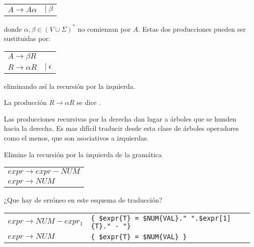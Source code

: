 \vspace{0.25cm}
\begin{center}
\begin{tabular}{ll}
$A   \rightarrow A \alpha$  & $|\ \beta$  
\end{tabular}
\end{center}

\noindent donde $\alpha, \beta \in (V \cup \Sigma)^*$ no comienzan por $A$.
Estas dos producciones pueden ser sustituidas por:

\vspace{0.25cm}
\begin{center}
\begin{tabular}{ll}
$A   \rightarrow \beta R$  &\\
$R   \rightarrow  \alpha R$ &$|\ \epsilon$
\end{tabular}
\end{center}

\noindent
eliminando así la recursión por la izquierda.

\begin{definition}
La producción $R   \rightarrow  \alpha R$ se dice .
\end{definition}

Las producciones recursivas por la derecha dan lugar a árboles
que se hunden hacia la derecha. Es mas difícil traducir desde esta clase
de árboles operadores como el menos, que son asociativos a izquierdas.

\begin{exercise}
Elimine la recursión por la izquierda de la gramática 

\vspace{0.5cm}
\begin{tabular}{l}
$expr   \rightarrow expr  -  NUM$  \\
$expr   \rightarrow NUM$            
\end{tabular}
\vspace{0.5cm}

\end{exercise}

\begin{exercise}
¿Que hay de erróneo en este esquema de traducción?

\vspace{0.5cm}
\begin{tabular}{ll}
$expr   \rightarrow NUM - expr_1$  & \verb|{ $expr{T} = $NUM{VAL}." ".$expr[1]{T}." - "}| \\
$expr   \rightarrow NUM$           & \verb|{ $expr{T} = $NUM{VAL} }|
\end{tabular}
\vspace{0.5cm}
\end{exercise}

